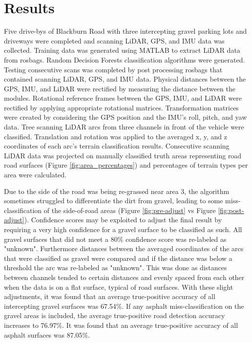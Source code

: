 \documentclass[journal,onecolumn]{IEEEtran}
\begin{document}
\section{Results}
	
	{Five drive-bys of Blackburn Road with three intercepting gravel parking lots and driveways were completed and scanning LiDAR, GPS, and IMU data was collected. Training data was generated using MATLAB to extract LiDAR data from rosbags. Random Decision Forests classification algorithms were generated. Testing consecutive scans was completed by post processing rosbags that contained scanning LiDAR, GPS, and IMU data. Physical distances between the GPS, IMU, and LiDAR were rectified by measuring the distance between the modules. Rotational reference frames between the GPS, IMU, and LiDAR were rectified by applying appropriate rotational matrices. Transformation matrices were created by considering the GPS position and the IMU's roll, pitch, and yaw data. Tree scanning LiDAR arcs from three channels in front of the vehicle were classified. Translation and rotation was applied to the averaged x, y, and z coordinates of each arc's terrain classification results. Consecutive scanning LiDAR data was projected on manually classified truth areas representing road road surfaces (Figure \ref{fig:area_percentages}) and percentages of terrain types per area were calculated. }
	
	{Due to the side of the road was being re-grassed near area $3$, the algorithm sometimes struggled to differentiate the dirt from gravel, leading to some miss-classification of the side-of-road areas (Figure \ref{fig:pre-adjust} vs Figure \ref{fig:post-adjust}). Confidence scores may be exploited to adjust the final result by requiring a very high confidence for a gravel surface to be classified as such. All gravel surfaces that did not meet a 80\% confidence score was re-labeled as "unknown". Furthermore distances between the averaged coordinates of the arcs that were classified as gravel were compared and if the distance was below a threshold the arc was re-labeled as "unknown". This was done as distances between channels tended to certain distances and evenly spaced from each other when the data is on a flat surface, typical of road surfaces. With these slight adjustments, it was found that an average true-positive accuracy of all intercepting gravel surfaces was 67.54\%. If any asphalt miss-classification on the gravel areas is included, the average true-positive road detection accuracy increases to 76.97\%. It was found that an average true-positive accuracy of all asphalt surfaces was 87.05\%. }
	
\end{document}
